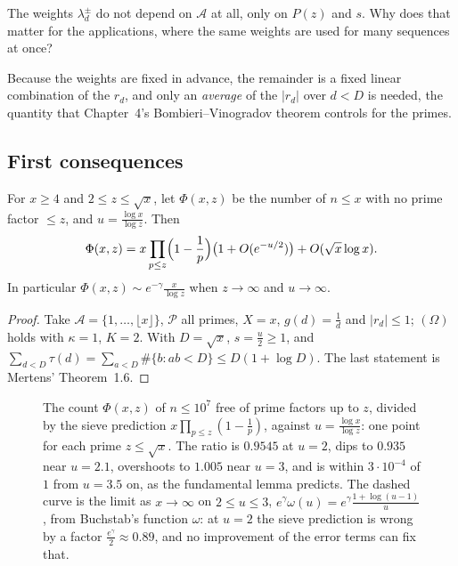 \begin{think}
The weights $\lambda^\pm_d$ do not depend on $\mathcal A$ at all, only on $P(z)$ and $s$. Why does that matter for the applications, where the same weights are used for many sequences at once?
\end{think}

Because the weights are fixed in advance, the remainder is a fixed linear combination of the $r_d$, and only an \emph{average} of the $|r_d|$ over $d<D$ is needed, the quantity that Chapter~4's Bombieri--Vinogradov theorem controls for the primes.

\subsection*{First consequences}

\begin{corollary}\label{cor:rough}
For $x\ge4$ and $2\le z\le\sqrt x$, let $\Phi(x,z)$ be the number of $n\le x$ with no prime factor $\le z$, and $u=\frac{\log x}{\log z}$. Then
\[
\Phi(x,z)=x\prod_{p\le z}\Bigl(1-\frac1p\Bigr)\bigl(1+O(e^{-u/2})\bigr)+O(\sqrt x\log x).
\]
In particular $\Phi(x,z)\sim e^{-\gamma}\frac x{\log z}$ when $z\to\infty$ and $u\to\infty$.
\end{corollary}
\begin{proof}
Take $\mathcal A=\{1,\dots,\lfloor x\rfloor\}$, $\mathcal P$ all primes, $X=x$, $g(d)=\frac1d$ and $|r_d|\le1$; $(\Omega)$ holds with $\kappa=1$, $K=2$. With $D=\sqrt x$, $s=\frac u2\ge1$, and $\sum_{d<D}\tau(d)=\sum_{a<D}\#\{b:ab<D\}\le D(1+\log D)$. The last statement is Mertens' Theorem~1.6.
\end{proof}

\begin{figure}[ht]
\centering
{}
\caption{The count $\Phi(x,z)$ of $n\le10^7$ free of prime factors up to $z$, divided by the sieve prediction $x\prod_{p\le z}(1-\frac1p)$, against $u=\frac{\log x}{\log z}$: one point for each prime $z\le\sqrt x$. The ratio is $0.9545$ at $u=2$, dips to $0.935$ near $u=2.1$, overshoots to $1.005$ near $u=3$, and is within $3\cdot10^{-4}$ of $1$ from $u=3.5$ on, as the fundamental lemma predicts. The dashed curve is the limit as $x\to\infty$ on $2\le u\le3$, $e^\gamma\omega(u)=e^\gamma\frac{1+\log(u-1)}u$, from Buchstab's function $\omega$: at $u=2$ the sieve prediction is wrong by a factor $\frac{e^\gamma}2\approx0.89$, and no improvement of the error terms can fix that.}
\label{fig:rough}
\end{figure}

